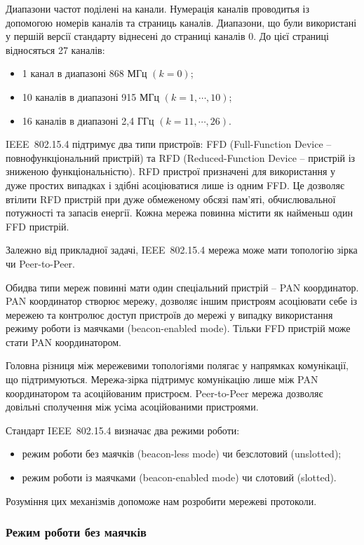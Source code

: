 \documentclass[a4paper,ukrainian,utf8,nocolumnsxix,floatsection]{eskdtext}
\renewcommand\paragraph{\subsubsection}
\newcommand{\todoi}[1]{\todo[inline]{#1}}
\newcommand{\iee}[0]{IEEE~802.15.4\xspace}
\begin{document}
\todoi{freq bands and data rates}

Диапазони частот поділені на канали. Нумерація каналів проводитья із допомогою номерів каналів та страниць каналів. Диапазони, що були використані у першій версії стандарту віднесені до страниці каналів 0. До цієї страниці відносяться 27 каналів: 
\begin{itemize}
	\item 1 канал в диапазоні 868 МГц $(k = 0)$;
	\item 10 каналів в диапазоні 915 МГц $(k = 1, \cdots, 10)$;
	\item 16 каналів в диапазоні 2,4 ГГц $(k = 11, \cdots, 26)$.
\end{itemize}

\iee підтримує два типи пристроїв: FFD (Full-Function Device – повнофункціональний пристрій) та RFD (Reduced-Function Device – пристрій із зниженою функціональністю). RFD пристрої призначені для використання у дуже простих випадках і здібні асоціюватися лише із одним FFD. Це дозволяє втілити RFD пристрій при дуже обмеженому обсязі пам’яті, обчислювальної потужності та запасів енергії. Кожна мережа повинна містити як найменьш один FFD пристрій. 

Залежно від прикладної задачі, \iee мережа може мати топологію зірка чи Peer-to-Peer. 

Обидва типи мереж повинні мати один спеціальний пристрій – PAN координатор. PAN координатор створює мережу, дозволяє іншим пристроям асоціювати себе із мережею та контролює доступ пристроїв до мережі у випадку використання режиму роботи із маячками (beacon-enabled mode). Тільки FFD пристрій може стати PAN координатором.

Головна різниця між мережевими топологіями полягає у напрямках комунікації, що підтримуються. Мережа-зірка підтримує комунікацію лише між PAN координатором та асоційованим пристроєм. Peer-to-Peer мережа дозволяє довільні сполучення між усіма асоційованими пристроями.

Стандарт \iee визначає два режими роботи:
\begin{itemize}
	\item режим роботи без маячків (beacon-less mode) чи безслотовий (unslotted);
	\item режим роботи із маячками (beacon-enabled mode) чи слотовий (slotted).
\end{itemize}

Розуміння цих механізмів допоможе нам розробити мережеві протоколи.


\paragraph{Режим роботи без маячків}
\end{document}
